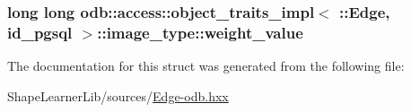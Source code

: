 \subsubsection[{weight\+\_\+value}]{\setlength{\rightskip}{0pt plus 5cm}long long odb\+::access\+::object\+\_\+traits\+\_\+impl$<$ \+::{\bf Edge}, id\+\_\+pgsql $>$\+::image\+\_\+type\+::weight\+\_\+value}\label{structodb_1_1access_1_1object__traits__impl_3_01_1_1_edge_00_01id__pgsql_01_4_1_1image__type_aeb60f252d8c8ee889f99fa9ed6e923cc}


The documentation for this struct was generated from the following file\+:\begin{DoxyCompactItemize}
\item 
Shape\+Learner\+Lib/sources/\hyperlink{_edge-odb_8hxx}{Edge-\/odb.\+hxx}\end{DoxyCompactItemize}
